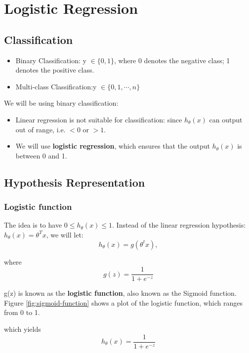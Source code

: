 \section{Logistic Regression}

    \subsection{Classification}
        
        \begin{itemize}
            \item Binary Classification: y $\in \{0, 1\}$, where 0 denotes the negative class; 1 denotes the positive class.
            \item Multi-class Classification:y $\in \{0, 1, \cdots, n\}$ 
        \end{itemize}

        We will be using binary classification: 
        \begin{itemize}
            \item Linear regression is not suitable for classification: since $h_\theta (x)$ can output out of range, i.e. $<0$ or $>1$. 
            \item We will use \textbf{logistic regression}, which ensures that the output $h_\theta (x)$ is between 0 and 1.
        \end{itemize}

    \subsection{Hypothesis Representation}

        \subsubsection{Logistic function}
            The idea is to have $ 0 \leq h_\theta (x) \leq 1$. Instead of the linear regression hypothesis: $h_\theta (x) = \theta^T x$, we will let:
                \[
                    h_\theta (x) = g (\theta^t x)
                ,\]

                where \[
                    g(z) = \frac{1}{1+e^{-z}}
                \]

                g(z) is known as the \textbf{logistic function}, also known as the Sigmoid function. Figure \ref{fig:sigmoid-function} shows a plot of the logistic function, which ranges from 0 to 1. 


                which yields 
                \begin{equation}
                    h_\theta (x) = \frac{1}{1+e^{-z}}
                    \label{eq:log-reg-hypo}
                \end{equation}


